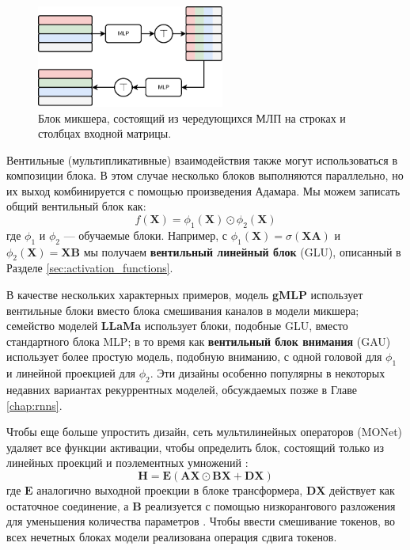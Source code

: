 \begin{figure}
    \centering
    \hspace{1em}\includegraphics[width=0.55\textwidth]{images/mixer}
    \caption{Блок микшера, состоящий из чередующихся МЛП на строках и столбцах входной матрицы.}
    \label{fig:mlp_mixer}
\end{figure}

Вентильные (мультипликативные) взаимодействия также могут использоваться в композиции блока. В этом случае несколько блоков выполняются параллельно, но их выход комбинируется с помощью произведения Адамара. Мы можем записать общий вентильный блок как:
%
\begin{equation}
f(\mathbf{X}) =\phi_1(\mathbf{X})\odot \phi_2(\mathbf{X})
\label{eq:glu_again}
\end{equation}
%
где $\phi_1$ и $\phi_2$ — обучаемые блоки. Например, с $\phi_1(\mathbf{X}) = \sigma(\mathbf{X}\mathbf{A})$ и $\phi_2(\mathbf{X})=\mathbf{X}\mathbf{B}$ мы получаем \textbf{вентильный линейный блок} (GLU), описанный в Разделе \ref{sec:activation_functions}.

В качестве нескольких характерных примеров, модель \textbf{gMLP} \cite{liu2021pay} использует
вентильные блоки вместо блока смешивания каналов в модели микшера; семейство моделей \textbf{LLaMa} \cite{touvron2023llama} использует блоки, подобные GLU, вместо стандартного блока MLP; в то время как \textbf{вентильный блок внимания} (GAU) \cite{hua2022transformer} использует более простую модель, подобную вниманию, с одной головой для $\phi_1$ и линейной проекцией для $\phi_2$. Эти дизайны особенно популярны в некоторых недавних вариантах рекуррентных моделей, обсуждаемых позже в Главе \ref{chap:rnns}.

Чтобы еще больше упростить дизайн, сеть мультилинейных операторов (MONet) удаляет все функции активации, чтобы определить блок, состоящий только из линейных проекций и поэлементных умножений \cite{cheng2024multilinear}:
%
$$
\mathbf{H}=\mathbf{E}(\mathbf{A}\mathbf{X}\odot\mathbf{B}\mathbf{X}+\mathbf{D}\mathbf{X})
$$
%
где $\mathbf{E}$ аналогично выходной проекции в блоке трансформера, $\mathbf{D}\mathbf{X}$ действует как остаточное соединение, а $\mathbf{B}$ реализуется с помощью низкорангового разложения для уменьшения количества параметров \cite{cheng2024multilinear}. Чтобы ввести смешивание токенов, во всех нечетных блоках модели реализована операция сдвига токенов.

